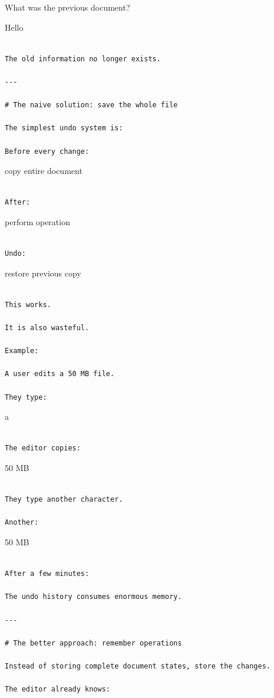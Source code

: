 \documentclass[
  oneside,
  openany]{book}
\begin{document}
What was the previous document?

Hello

\begin{verbatim}

The old information no longer exists.

---

# The naive solution: save the whole file

The simplest undo system is:

Before every change:
\end{verbatim}

copy entire document

\begin{verbatim}

After:
\end{verbatim}

perform operation

\begin{verbatim}

Undo:
\end{verbatim}

restore previous copy

\begin{verbatim}

This works.

It is also wasteful.

Example:

A user edits a 50 MB file.

They type:
\end{verbatim}

a

\begin{verbatim}

The editor copies:
\end{verbatim}

50 MB

\begin{verbatim}

They type another character.

Another:
\end{verbatim}

50 MB

\begin{verbatim}

After a few minutes:

The undo history consumes enormous memory.

---

# The better approach: remember operations

Instead of storing complete document states, store the changes.

The editor already knows:
\end{verbatim}
\end{document}
